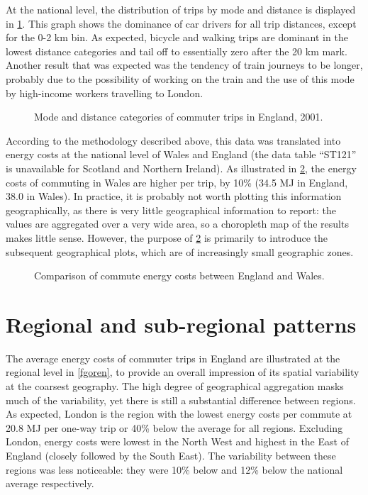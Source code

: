 At the national level, the distribution of trips by mode and distance is
displayed in \cref{fengmodedis}. This graph shows the
dominance of car drivers for all trip distances, except for the 0-2 km bin.
As expected, bicycle and walking trips are dominant in the lowest
distance categories and tail off to essentially zero after the 20 km mark.
Another result that was expected was the tendency of train journeys to
be longer, probably due to the possibility of working on the train and
the use of this mode by high-income workers travelling to London.

\begin{figure}[htbp]
  \caption[Mode and distance categories of commute in England]
  {Mode and distance categories of commuter trips in England, 2001.}
  \label{fengmodedis}
\end{figure} %

According to the methodology described above,
this data was translated into energy costs at the national level of
Wales and England (the data table ``ST121'' is unavailable for Scotland and
Northern Ireland). As illustrated in \cref{few}, the energy costs of commuting
in Wales are higher per trip, by 10\% (34.5 MJ in England, 38.0 in Wales).
In practice, it is probably not worth plotting this information geographically,
as there is very little geographical information to report:
the values are aggregated over a very wide area, so a choropleth map
of the results makes little sense. However, the purpose of  \cref{few}
is primarily to introduce the subsequent geographical plots, which
are of increasingly small geographic zones.

\begin{figure}
 \centering{
 \texttt{[image: ew]} }
 \caption{Comparison of commute energy costs between England and Wales.}
 \label{few}
\end{figure}



\section{Regional and sub-regional patterns} \label{sregional}
The average energy costs of commuter trips in England
are illustrated at the regional level in \cref{fgoren}, to provide an
overall impression of its spatial variability at the coarsest geography.
The high degree of geographical aggregation masks much of the variability,
yet there is still a substantial difference between regions. As expected,
London is the region with the lowest energy costs per commute at
20.8 MJ per one-way trip or 40\% below the average for all regions.
Excluding London, energy costs were lowest in the North West
and highest in the East of England (closely followed by the South East).
The variability between these regions was less noticeable:
they were 10\% below and 12\% below the national average respectively.


